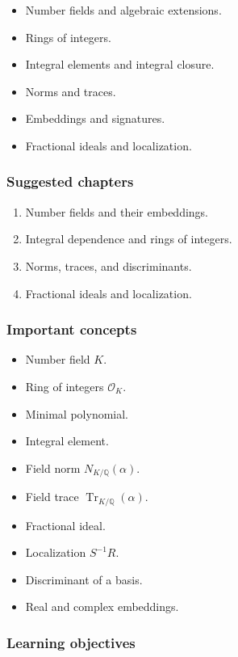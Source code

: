 \documentclass[11pt]{article}
\begin{document}
\begin{itemize}
    \item Number fields and algebraic extensions.
    \item Rings of integers.
    \item Integral elements and integral closure.
    \item Norms and traces.
    \item Embeddings and signatures.
    \item Fractional ideals and localization.
\end{itemize}

\subsubsection*{Suggested chapters}

\begin{enumerate}
    \item Number fields and their embeddings.
    \item Integral dependence and rings of integers.
    \item Norms, traces, and discriminants.
    \item Fractional ideals and localization.
\end{enumerate}

\subsubsection*{Important concepts}

\begin{itemize}
    \item Number field \(K\).
    \item Ring of integers \(\mathcal{O}_K\).
    \item Minimal polynomial.
    \item Integral element.
    \item Field norm \(N_{K/\mathbb{Q}}(\alpha)\).
    \item Field trace \(\operatorname{Tr}_{K/\mathbb{Q}}(\alpha)\).
    \item Fractional ideal.
    \item Localization \(S^{-1}R\).
    \item Discriminant of a basis.
    \item Real and complex embeddings.
\end{itemize}

\subsubsection*{Learning objectives}
\end{document}
